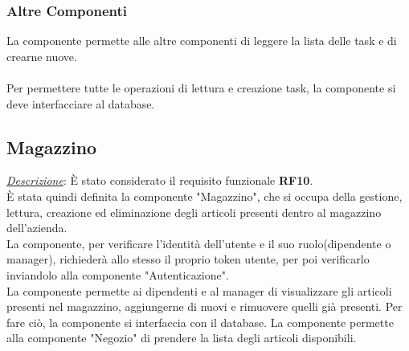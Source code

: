 \documentclass{report}
\begin{document}
\subsubsection*{Altre Componenti}
La componente permette alle altre componenti di leggere la lista delle task e di crearne nuove.\\\\
Per permettere tutte le operazioni di lettura e creazione task, la componente si deve interfacciare al database.


\subsection*{Magazzino}
\uline{\textit{Descrizione}}:
È stato considerato il requisito funzionale \textbf{RF10}.\\
È stata quindi definita la componente "Magazzino", che si occupa della gestione, lettura, creazione ed eliminazione degli articoli presenti dentro al magazzino dell'azienda.\\
La componente, per verificare l'identità dell'utente e il suo ruolo(dipendente o manager), richiederà allo stesso il proprio token utente, per poi verificarlo inviandolo alla componente "Autenticazione".\\
La componente permette ai dipendenti e al manager di visualizzare gli articoli presenti nel magazzino, aggiungerne di nuovi e rimuovere quelli già presenti. Per fare ciò, la componente si interfaccia con il database.
La componente permette alla componente "Negozio" di prendere la lista degli articoli disponibili. 
\end{document}
